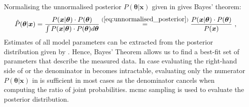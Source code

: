 %
Normalising the unnormalised posterior 
$P(\boldsymbol{\theta}|\boldsymbol{x})$ given in  gives Bayes' theorem:
%
\begin{equation} \label{eq:bayes-theorem}
 \hat{P}(\boldsymbol{\theta}|\boldsymbol{x}) = \frac{P(\boldsymbol{x}|\boldsymbol{\theta}) \cdot P(\boldsymbol{\theta})}{\int P(\boldsymbol{x}|\boldsymbol{\theta}) \cdot P(\boldsymbol{\theta}) d\boldsymbol{\theta}} \overset{(\ref{eq:unnormalised_posterior})}{=} \frac{P(\boldsymbol{x}|\boldsymbol{\theta}) \cdot P(\boldsymbol{\theta})}{P(\boldsymbol{x})} \ ,
\end{equation}  
%
Estimates of all model parameters can be extracted from the posterior distribution given by . Hence, Bayes' Theorem allows us to find a best-fit set of parameters that describe the measured data. In case evaluating the right-hand side of  or the denominator in  becomes intractable, evaluating only the numerator $P(\boldsymbol{\theta}|\boldsymbol{x})$ in  is sufficient in most cases as the denominator cancels when computing the ratio of joint probabilities. \acrshort{mcmc} sampling is used to evaluate the posterior distribution.
%
\vspace{-3mm}
